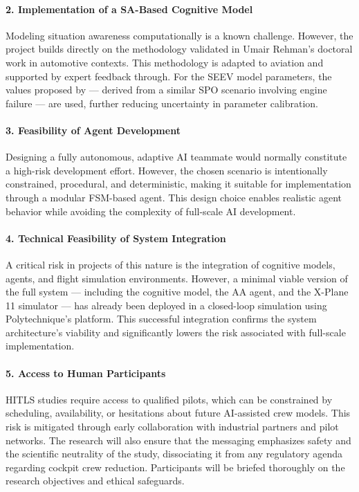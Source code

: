 \documentclass[12pt,a4paper]{article} %
\begin{document}
	\paragraph{2. Implementation of a SA-Based Cognitive Model}

	Modeling situation awareness computationally is a known challenge. However, the project builds directly on the methodology validated in Umair Rehman's doctoral work in automotive contexts. This methodology is adapted to aviation and supported by expert feedback through. For the SEEV model parameters, the values proposed by \parencite{wang_real-time_2024} — derived from a similar SPO scenario involving engine failure — are used, further reducing uncertainty in parameter calibration.

	\paragraph{3. Feasibility of Agent Development}

	Designing a fully autonomous, adaptive AI teammate would normally constitute a high-risk development effort. However, the chosen scenario is intentionally constrained, procedural, and deterministic, making it suitable for implementation through a modular FSM-based agent. This design choice enables realistic agent behavior while avoiding the complexity of full-scale AI development.

	\paragraph{4. Technical Feasibility of System Integration}

	A critical risk in projects of this nature is the integration of cognitive models, agents, and flight simulation environments. However, a minimal viable version of the full system — including the cognitive model, the AA agent, and the X-Plane 11 simulator — has already been deployed in a closed-loop simulation using Polytechnique's platform. This successful integration confirms the system architecture's viability and significantly lowers the risk associated with full-scale implementation.

	\paragraph{5. Access to Human Participants}

	HITLS studies require access to qualified pilots, which can be constrained by scheduling, availability, or hesitations about future AI-assisted crew models. This risk is mitigated through early collaboration with industrial partners and pilot networks. The research will also ensure that the messaging emphasizes safety and the scientific neutrality of the study, dissociating it from any regulatory agenda regarding cockpit crew reduction. Participants will be briefed thoroughly on the research objectives and ethical safeguards.
\end{document}

